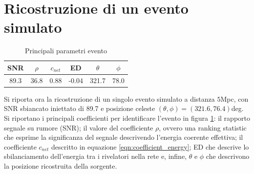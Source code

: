 \section{Ricostruzione di un evento simulato}
\label{subsection:APR4}
\begin{table}
	\vspace{-8pt}
	\begin{tabular}{cccccc}
		\toprule
		SNR	&$\rho$	&$c_{net}$	&ED	&$\theta$	&$\phi$	\\
		\midrule
		89.3	&36.8	&0.88	&-0.04	&321.7	&78.0	\\
		\bottomrule
	\end{tabular}
	\caption{Principali parametri evento}
	\label{tab:parametri}
	\vspace{-10pt}
\end{table}
Si riporta ora la ricostruzione di un singolo evento simulato a distanza $5$Mpc, con SNR sbiancato iniettato di 89.7 e posizione celeste $(\theta,\phi)=(321.6, 76.4)$deg.
Si riportano i principali coefficienti per identificare l'evento in figura \ref{tab:parametri}: il rapporto segnale su rumore (SNR); il valore del coefficiente $\rho$, ovvero una ranking statistic che esprime la significanza del segnale descrivendo l'energia coerente effettiva; il coefficiente $c_{net}$ descritto in equazione \ref{eqn:coefficient_energy}; ED che descrive lo sbilanciamento dell'energia tra i rivelatori nella rete e, infine, $\theta$ e $\phi$ che descrivono la posizione ricostruita della sorgente.
